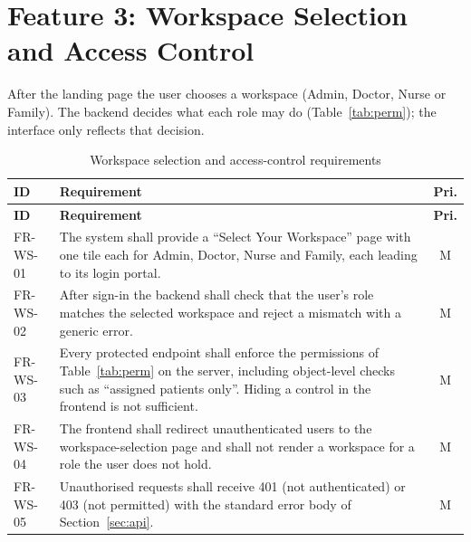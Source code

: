 \documentclass[a4paper,11pt]{scrreprt}
\makeatletter
\newenvironment{reqtable}[1]{%
  \small
  \begin{longtable}{@{}>{\ttfamily\footnotesize}p{2.55cm}>{\raggedright\arraybackslash}p{10.7cm}c@{}}
  \caption{#1}\\
  \toprule \textbf{ID} & \textbf{Requirement} & \textbf{Pri.}\\ \midrule
  \endfirsthead
  \toprule \textbf{ID} & \textbf{Requirement} & \textbf{Pri.}\\ \midrule
  \endhead
  \bottomrule
  \endfoot
}{%
  \end{longtable}\normalsize
}
\newcommand{\req}[3]{#1 & #2 & #3 \\ \midrule}
\makeatother
\begin{document}
\section{Feature 3: Workspace Selection and Access Control}
After the landing page the user chooses a workspace (Admin, Doctor, Nurse or Family). The backend decides what each role may do (Table~\ref{tab:perm}); the interface only reflects that decision.
\begin{reqtable}{Workspace selection and access-control requirements}
\req{FR-WS-01}{The system shall provide a ``Select Your Workspace'' page with one tile each for Admin, Doctor, Nurse and Family, each leading to its login portal.}{M}
\req{FR-WS-02}{After sign-in the backend shall check that the user's role matches the selected workspace and reject a mismatch with a generic error.}{M}
\req{FR-WS-03}{Every protected endpoint shall enforce the permissions of Table~\ref{tab:perm} on the server, including object-level checks such as ``assigned patients only''. Hiding a control in the frontend is not sufficient.}{M}
\req{FR-WS-04}{The frontend shall redirect unauthenticated users to the workspace-selection page and shall not render a workspace for a role the user does not hold.}{M}
\req{FR-WS-05}{Unauthorised requests shall receive 401 (not authenticated) or 403 (not permitted) with the standard error body of Section~\ref{sec:api}.}{M}
\end{reqtable}
\end{document}

